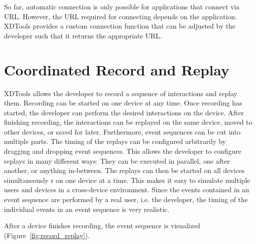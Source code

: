 So far, automatic connection is only possible for applications that connect via URL. However, the URL required for connecting depends on the application. XDTools provides a custom connection function that can be adjusted by the developer such that it returns the appropriate URL.

\section{Coordinated Record and Replay}

XDTools allows the developer to record a sequence of interactions and replay them. Recording can be started on one device at any time. Once recording has started, the developer can perform the desired interactions on the device. After finishing recording, the interactions can be replayed on the same device, moved to other devices, or saved for later.  Furthermore, event sequences can be cut into multiple parts. The timing of the replays can be configured arbitrarily by dragging and dropping event sequences. This allows the developer to configure replays in many different ways: They can be executed in parallel, one after another, or anything in-between. The replays can then be started on all devices simultaneously r on one device at a time. This makes it easy to simulate multiple users and devices in a cross-device environment. Since the events contained in an event sequence are performed by a real user, i.e. the developer, the timing of the individual events in an event sequence is very realistic.

After a device finishes recording, the event sequence is visualized (Figure~\ref{fig:record_replay}).

